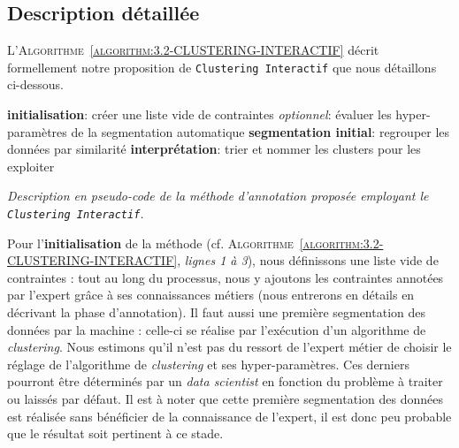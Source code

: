 	
	\subsection{Description détaillée}
	\label{section:3.2.2-DESCRIPTION-THEORIQUE-DETAILLEE}
	
		L'\textsc{Algorithme~\ref{algorithm:3.2-CLUSTERING-INTERACTIF}} décrit formellement notre proposition de \texttt{Clustering Interactif} que nous détaillons ci-dessous.
		\begin{algorithm}
			\textbf{initialisation}: créer une liste vide de contraintes \;
			\textit{optionnel}: évaluer les hyper-paramètres de la segmentation automatique \;
			\textbf{segmentation initial}: regrouper les données par similarité \;
			\textbf{interprétation}: trier et nommer les clusters pour les exploiter \;
			\caption{\textit{
				Description en pseudo-code de la méthode d'annotation proposée employant le \texttt{Clustering Interactif}.
			}}
			\label{algorithm:3.2-CLUSTERING-INTERACTIF}
		\end{algorithm}
		
		Pour l'\textbf{initialisation} de la méthode (cf. \textsc{Algorithme~\ref{algorithm:3.2-CLUSTERING-INTERACTIF}}, \textit{lignes 1 à 3}), nous définissons une liste vide de contraintes : tout au long du processus, nous y ajoutons les contraintes annotées par l'expert grâce à ses connaissances métiers (nous entrerons en détails en décrivant la phase d'annotation).
		Il faut aussi une première segmentation des données par la machine : celle-ci se réalise par l'exécution d'un algorithme de \textit{clustering}.
		Nous estimons qu'il n'est pas du ressort de l'expert métier de choisir le réglage de l'algorithme de \textit{clustering} et ses hyper-paramètres.
		Ces derniers pourront être déterminés par un \textit{data scientist} en fonction du problème à traiter ou laissés par défaut.
		Il est à noter que cette première segmentation des données est réalisée sans bénéficier de la connaissance de l'expert, il est donc peu probable que le résultat soit pertinent à ce stade.
		
